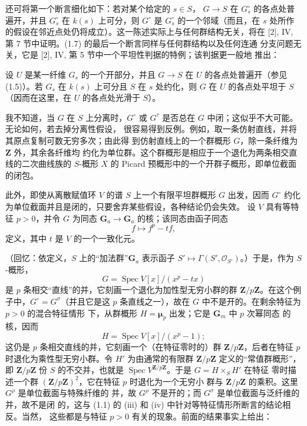 还可将第一个断言细化如下：若对某个给定的 $s\in S$，
$G\longrightarrow S$ 在 $G_s^\circ$ 的各点处普遍开，并且 $G_s^\circ$ 在
$k(s)$ 上可分，则 $G^\circ$ 是 $G_s^\circ$ 的一个邻域（而且，在 $s$
处所作的假设在邻近点处仍将成立）。这一陈述实际上与任何群结构无关，将在
[2], IV, 第 7 节中证明。(1.7) 的最后一个断言同样与任何群结构以及任何连通
分支问题无关，它是 [2], IV, 第 5 节中一个平坦性判据的特例；该判据更一般地
推出：

 设 $U$ 是某一纤维 $G_s$ 的一个开部分，并且
$G\longrightarrow S$ 在 $U$ 的各点处普遍开（参见 (1.5)）。若 $G_s$ 在
$k(s)$ 上可分且 $S$ 在 $s$ 处约化，则 $G$ 在 $U$ 的各点处平坦于 $S$
（因而在这里，在 $U$ 的各点处光滑于 $S$）。

 我不知道，当 $G$ 在 $S$ 上分离时，$G^\circ$ 或
$G^\tau$ 是否总在 $G$ 中闭；这似乎不大可能。无论如何，若去掉分离性假设，
很容易得到反例。例如，取一条仿射直线，并将其原点复制可数无穷多次；由此得
到仿射直线上的一个群概形 $G$，除一条纤维为 $\mathbf Z$ 外，其余各纤维均
约化为单位群。这个群概形是相应于一个退化为两条相交直线的二次曲线族的
$S$-概形 $X$ 的 Picard 预概形中的一个开群子概形，即单位截面的闭包。

此外，即使从离散赋值环 $V$ 的谱 $S$ 上一个有限平坦群概形 $G$ 出发，因而
$G^\circ$ 约化为单位截面并且是闭的，只要舍弃某些假设，各种结论仍会失效。
设 $V$ 具有等特征 $p>0$，并令 $G$ 为同态
$\mathbf G_a\longrightarrow\mathbf G_a$ 的核；该同态由函子同态
\[
f\longmapsto f^p-tf,
\]
定义，其中 $t$ 是 $V$ 的一个一致化元。

（回忆：依定义，$S$ 上的“加法群”$\mathbf G_a$ 表示函子
$S'\longmapsto\Gamma(S',\mathcal O_{S'})$。）于是，作为 $S$-概形，
\[
G=\operatorname{Spec}V[x]/(x^p-tx)
\]
是 $p$ 条相交“直线”的并，它刻画一个退化为加性型无穷小群的群
$\mathbf Z/p\mathbf Z$。在这个例子中，$G^\circ=G^\sigma$（并且它是这
$p$ 条直线之一），故在 $G$ 中不是开的。在剩余特征为 $p>0$ 的混合特征情形
下，从群概形 $H=\boldsymbol\mu_p$ 出发；它是 $\mathbf G_m$ 中 $p$ 次幂同态
的核，因而
\[
H=\operatorname{Spec}V[x]/(x^p-1) ;
\]
这仍是 $p$ 条相交直线的并，它刻画一个（在特征零时的）群
$\mathbf Z/p\mathbf Z$，后者在特征 $p$ 时退化为乘性型无穷小群。令 $H'$
为由通常的有限群 $\mathbf Z/p\mathbf Z$ 定义的“常值群概形”，即
$\mathbf Z/p\mathbf Z$ 份 $S$ 的不交并，也就是
$\operatorname{Spec}V^{\mathbf Z/p\mathbf Z}$。于是 $G=H\times_S H'$ 在特征
零时描述一个群 $(\mathbf Z/p\mathbf Z)^2$，它在特征 $p$ 时退化为一个无穷小
群与 $\mathbf Z/p\mathbf Z$ 的乘积。这里 $G^\rho$ 是单位截面与特殊纤维的
并，故 $G^\rho$ 不是开的；而 $G^\sigma$ 是单位截面与泛纤维的并，故不是闭
的，这与 (1.1) 的 (iii) 和 (iv) 中针对等特征情形所断言的结论相反。当然，
这些都是与特征 $p>0$ 有关的现象。前面的结果事实上给出：


